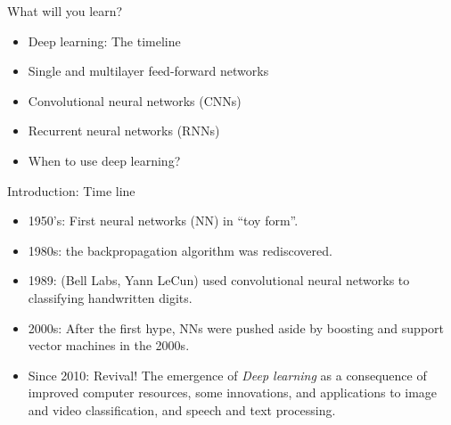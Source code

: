 \documentclass[
  10pt,
  ignorenonframetext,
]{beamer}
\providecommand{\tightlist}{%
  \setlength{\itemsep}{0pt}\setlength{\parskip}{0pt}}
\begin{document}
\begin{frame}
\begin{block}{What will you learn?}
\protect\hypertarget{what-will-you-learn}{}
\(~\)

\begin{itemize}
\tightlist
\item
  Deep learning: The timeline
\end{itemize}

\vspace{2mm}

\begin{itemize}
\tightlist
\item
  Single and multilayer feed-forward networks
\end{itemize}

\vspace{2mm}

\begin{itemize}
\tightlist
\item
  Convolutional neural networks (CNNs)
\end{itemize}

\vspace{2mm}

\begin{itemize}
\tightlist
\item
  Recurrent neural networks (RNNs)
\end{itemize}

\vspace{2mm}

\begin{itemize}
\tightlist
\item
  When to use deep learning?
\end{itemize}
\end{block}
\end{frame}

\begin{frame}{Introduction: Time line}
\protect\hypertarget{introduction-time-line}{}
\(~\)

\begin{itemize}
\item
  1950's: First neural networks (NN) in ``toy form''.
\item
  1980s: the backpropagation algorithm was rediscovered.
\item
  1989: (Bell Labs, Yann LeCun) used convolutional neural networks to
  classifying handwritten digits.
\item
  2000s: After the first hype, NNs were pushed aside by boosting and
  support vector machines in the 2000s.
\item
  Since 2010: Revival! The emergence of \emph{Deep learning} as a
  consequence of improved computer resources, some innovations, and
  applications to image and video classification, and speech and text
  processing.
\end{itemize}

\(~\)
\end{frame}
\end{document}

